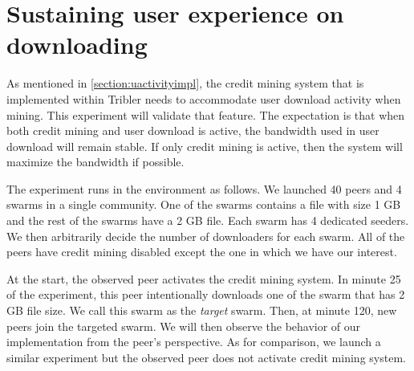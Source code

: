 \vspace{-0.3cm} 
\section{Sustaining user experience on downloading}
\label{section:expprio}
As mentioned in \ref{section:uactivityimpl}, the credit mining system that is implemented within Tribler needs to accommodate user download activity when mining. This experiment will validate that feature. The expectation is that when both credit mining and user download is active, the bandwidth used in user download will remain stable. If only credit mining is active, then the system will maximize the bandwidth if possible. 

The experiment runs in the environment as follows. We launched 40 peers and 4 swarms in a single community. One of the swarms contains a file with size 1 GB and the rest of the swarms have a 2 GB file. Each swarm has 4 dedicated seeders. We then arbitrarily decide the number of downloaders for each swarm. All of the peers have credit mining disabled except the one in which we have our interest. 

At the start, the observed peer activates the credit mining system. In minute 25 of the experiment, this peer intentionally downloads one of the swarm that has 2 GB file size. We call this swarm as the \textit{target} swarm. Then, at minute 120, new peers join the targeted swarm. We will then observe the behavior of our implementation from the peer's perspective. As for comparison, we launch a similar experiment but the observed peer does not activate credit mining system. 

